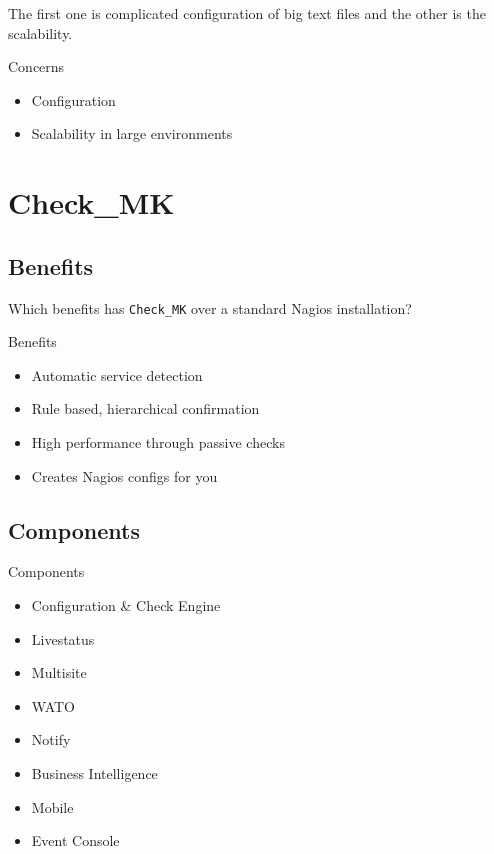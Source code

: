 The first one is complicated configuration of big text files
and the other is the scalability.

\begin{frame}{Concerns}

\begin{itemize}
\item Configuration
\item Scalability in large environments
\end{itemize}
\end{frame}

\section{Check\_MK}

\subsection{Benefits}

Which benefits has \verb|Check_MK| over a standard Nagios installation?

\begin{frame}[fragile]{Benefits}
\begin{itemize}
\item Automatic service detection
\item Rule based, hierarchical confirmation
\item High performance through passive checks
\item Creates Nagios configs for you
\end{itemize}
\end{frame}

\subsection{Components}
\begin{frame}[fragile]{Components}
\begin{itemize}
\item Configuration \& Check Engine
\item Livestatus
\item Multisite
\item WATO
\item Notify
\item Business Intelligence
\item Mobile
\item Event Console
\end{itemize}
\end{frame}

